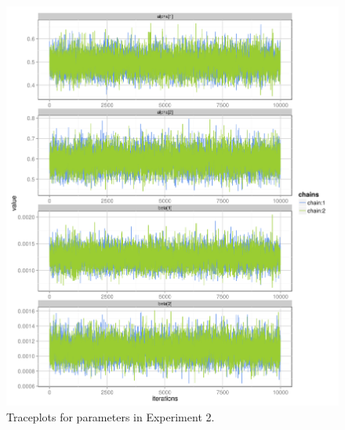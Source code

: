 \begin{figure}[ht!]
  \centering
  \includegraphics{../figures/main/trace_2.png}
  \caption{Traceplots for parameters in Experiment 2.}
  \label{fig:trace_2}
\end{figure}
